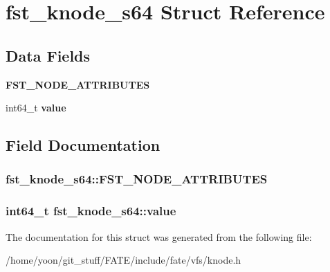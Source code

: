 \hypertarget{structfst__knode__s64}{\section{fst\-\_\-knode\-\_\-s64 Struct Reference}
\label{structfst__knode__s64}
}
\subsection*{Data Fields}
\begin{DoxyCompactItemize}
\item 
\hypertarget{structfst__knode__s64_a2971bab90ebed9ee0d9135ad949d2b31}{{\bfseries F\-S\-T\-\_\-\-N\-O\-D\-E\-\_\-\-A\-T\-T\-R\-I\-B\-U\-T\-E\-S}}\label{structfst__knode__s64_a2971bab90ebed9ee0d9135ad949d2b31}

\item 
\hypertarget{structfst__knode__s64_ad6b755b50d4da3d73b41fb71ced9cf4a}{int64\-\_\-t {\bfseries value}}\label{structfst__knode__s64_ad6b755b50d4da3d73b41fb71ced9cf4a}

\end{DoxyCompactItemize}


\subsection{Field Documentation}
\hypertarget{structfst__knode__s64_a2971bab90ebed9ee0d9135ad949d2b31}{
\subsubsection[{F\-S\-T\-\_\-\-N\-O\-D\-E\-\_\-\-A\-T\-T\-R\-I\-B\-U\-T\-E\-S}]{\setlength{\rightskip}{0pt plus 5cm}fst\-\_\-knode\-\_\-s64\-::\-F\-S\-T\-\_\-\-N\-O\-D\-E\-\_\-\-A\-T\-T\-R\-I\-B\-U\-T\-E\-S}}\label{structfst__knode__s64_a2971bab90ebed9ee0d9135ad949d2b31}
\hypertarget{structfst__knode__s64_ad6b755b50d4da3d73b41fb71ced9cf4a}{
\subsubsection[{value}]{\setlength{\rightskip}{0pt plus 5cm}int64\-\_\-t fst\-\_\-knode\-\_\-s64\-::value}}\label{structfst__knode__s64_ad6b755b50d4da3d73b41fb71ced9cf4a}


The documentation for this struct was generated from the following file\-:\begin{DoxyCompactItemize}
\item 
/home/yoon/git\-\_\-stuff/\-F\-A\-T\-E/include/fate/vfs/knode.\-h\end{DoxyCompactItemize}
